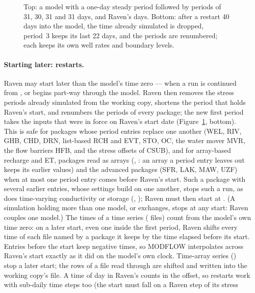 \begin{figure}[!htbp]\centering
\caption{Top: a model with a one-day steady period followed by periods of 31, 30, 31 and 31 days, and Raven's days. Bottom: after a restart 40 days into the model, the time already simulated is dropped, period~3 keeps its last 22 days, and the periods are renumbered; each keeps its own well rates and boundary levels.}\label{fig:periods}
\end{figure}

\paragraph{Starting later: restarts.} Raven may start later than the model's time zero --- when a run is continued from
, or begins part-way through the model. Raven then removes the stress periods already simulated from the
working copy, shortens the period that holds Raven's start, and renumbers the periods of every package; the new first period
takes the inputs that were in force on Raven's start date (Figure~\ref{fig:periods}, bottom). This is safe for packages whose period
entries replace one another (WEL, RIV, GHB, CHD, DRN, list-based RCH and EVT, STO, OC, the water mover MVR, the flow barriers HFB,
and the stress offsets of CSUB), and for array-based recharge and ET, packages read as arrays (, :
an array a period entry leaves out keeps its earlier values) and the advanced packages (SFR, LAK, MAW, UZF) when at most one period entry comes before Raven's
start. Such a package with several earlier entries, whose settings build on one another, stops such a run, as does
time-varying conductivity or storage (, ); Raven must then start at . (A
simulation holding more than one model, or exchanges, stops at any start: Raven couples one model.) The times of a time series ( files) count from the
model's own time zero: on a later start, even one inside the first period, Raven shifts every time of each  file
named by a package it keeps by the time elapsed before its start. Entries before the start keep negative times,
so MODFLOW interpolates across Raven's start exactly as it did on the model's own clock. Time-array series () stop
a later start; the rows of a  file read through
 are shifted and written into the working copy's  file. A time of day in Raven's 
counts in the offset, so restarts work with sub-daily time steps too (the start must fall on a Raven step of its stress
